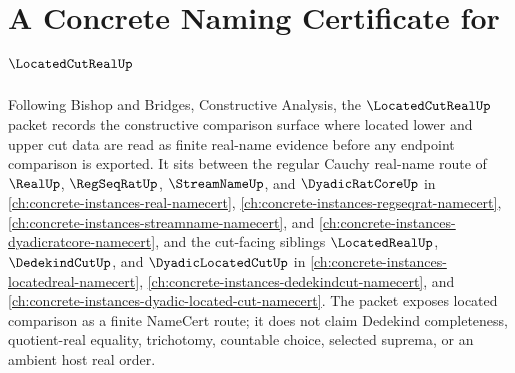 \chapter{A Concrete Naming Certificate for $\LocatedCutRealUp$}
\label{ch:concrete-instances-located-cut-real-namecert}

Following Bishop and Bridges, Constructive Analysis, the $\LocatedCutRealUp$ packet records the constructive comparison surface where located lower and upper cut data are read as finite real-name evidence before any endpoint comparison is exported. It sits between the regular Cauchy real-name route of $\RealUp$, $\RegSeqRatUp$, $\StreamNameUp$, and $\DyadicRatCoreUp$ in \autoref{ch:concrete-instances-real-namecert}, \autoref{ch:concrete-instances-regseqrat-namecert}, \autoref{ch:concrete-instances-streamname-namecert}, and \autoref{ch:concrete-instances-dyadicratcore-namecert}, and the cut-facing siblings $\LocatedRealUp$, $\DedekindCutUp$, and $\DyadicLocatedCutUp$ in \autoref{ch:concrete-instances-locatedreal-namecert}, \autoref{ch:concrete-instances-dedekindcut-namecert}, and \autoref{ch:concrete-instances-dyadic-located-cut-namecert}. The packet exposes located comparison as a finite NameCert route; it does not claim Dedekind completeness, quotient-real equality, trichotomy, countable choice, selected suprema, or an ambient host real order.

